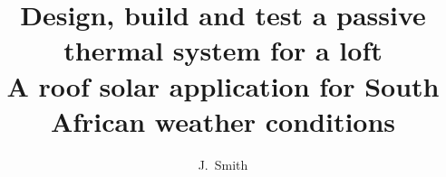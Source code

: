 \documentclass[14pt,afrikaans,english]{memoir}
\title{Design, build and test a passive thermal system for a loft\\[2ex]
       \normalsize A roof solar application for South African weather conditions}
\author{J.\ Smith}{John Smith}
\begin{document}
\frontmatter
\TitlePage
\end{document}
